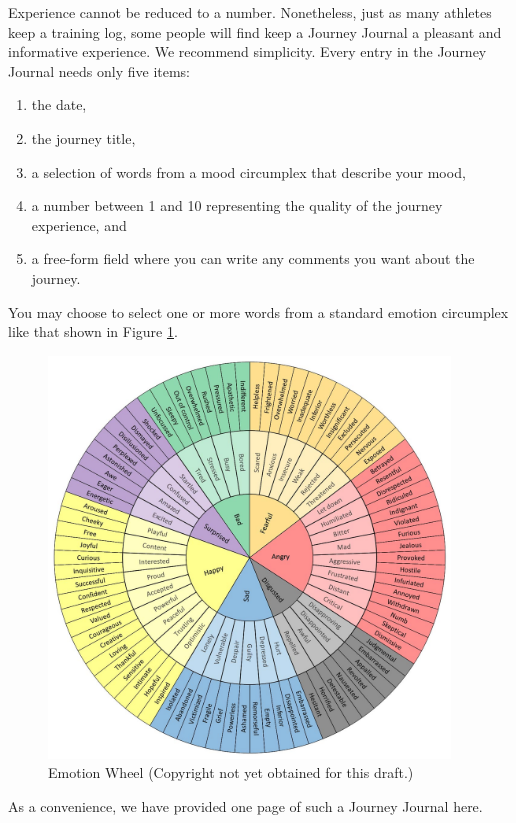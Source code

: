 \documentclass[12pt]{book}
\begin{document}
Experience cannot be reduced to a number.  Nonetheless, just
as many athletes keep a training log, some people will find
keep a Journey Journal a pleasant and informative experience.
We recommend simplicity. Every entry in the Journey Journal
needs only five items:
\begin{enumerate}
\item the date,
\item the journey title,
\item a selection of words from a mood circumplex that
  describe your mood,
\item a number between 1 and 10 representing the quality of
  the journey experience, and
\item a free-form field where you can write any comments
  you want about the journey.
\end{enumerate}

You may choose to select one or more words from a standard
emotion circumplex like that shown in Figure \ref{fig:emotionwheel}.
\begin{figure}
  \centering
     \includegraphics[width=0.95\textwidth]{WacuriFigures/EmotionWheel.jpg}
     \caption{Emotion Wheel (Copyright not yet obtained for this draft.)}
  \label{fig:emotionwheel}     
\end{figure}


As a convenience, we have provided one page of such a Journey Journal here.
\end{document}
